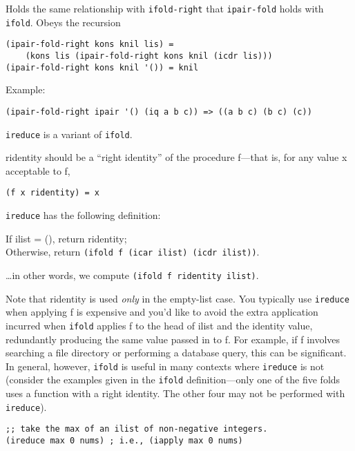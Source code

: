 \begin{entry}{%
  }

  Holds the same relationship with
  \texttt{ifold-right} that \texttt{ipair-fold} holds with
  \texttt{ifold}. Obeys the recursion

\begin{verbatim}
(ipair-fold-right kons knil lis) = 
    (kons lis (ipair-fold-right kons knil (icdr lis)))
(ipair-fold-right kons knil '()) = knil
\end{verbatim}

  Example:

\begin{verbatim}
(ipair-fold-right ipair '() (iq a b c)) => ((a b c) (b c) (c))
\end{verbatim}
\end{entry}

\begin{entry}{%
  }

  \texttt{ireduce} is a variant of \texttt{ifold}.

  ridentity should be a ``right identity'' of the procedure f---that
  is, for any value x acceptable to f,

\begin{verbatim}
(f x ridentity) = x
\end{verbatim}

  \texttt{ireduce} has the following definition:

  If ilist = (), return ridentity;\\
  Otherwise, return \texttt{(ifold\ f\ (icar\ ilist)\ (icdr\ ilist))}.

  \ldots{}in other words, we compute \texttt{(ifold\ f\ ridentity\
    ilist)}.

  Note that ridentity is used \emph{only} in the empty-list case. You
  typically use \texttt{ireduce} when applying f is expensive and
  you'd like to avoid the extra application incurred when
  \texttt{ifold} applies f to the head of ilist and the identity
  value, redundantly producing the same value passed in to f. For
  example, if f involves searching a file directory or performing a
  database query, this can be significant. In general, however,
  \texttt{ifold} is useful in many contexts where \texttt{ireduce} is
  not (consider the examples given in the \texttt{ifold}
  definition---only one of the five folds uses a function with a right 
  identity. The other four may not be performed with
  \texttt{ireduce}).

\begin{verbatim}
;; take the max of an ilist of non-negative integers.
(ireduce max 0 nums) ; i.e., (iapply max 0 nums)
\end{verbatim}
\end{entry}

